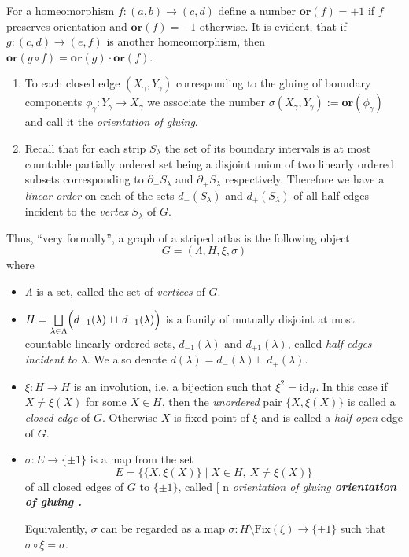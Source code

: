 \documentclass[12pt, reqno]{amsart}
\makeatletter
\def\myemphInternal#1{\if n\f@shape%
\begingroup\itshape #1\endgroup\/%
\else\begingroup\bfseries #1\endgroup%
\fi}
\def\myemph{\futurelet\testchar\MaybeOptArgmyemph}
\def\MaybeOptArgmyemph{\ifx[\testchar \let\next\OptArgmyemph
                 \else \let\next\NoOptArgmyemph \fi \next}
\def\OptArgmyemph[#1]#2{\index{#1}\myemphInternal{#2}}
\def\NoOptArgmyemph#1{\myemphInternal{#1}}
\newcommand{\strip}{S}
\newcommand{\bdX}{X}
\newcommand{\bdY}{Y}
\newcommand{\stInd}{{\lambda}}
\newcommand{\StInd}{\Lambda}
\newcommand{\bdGlueInd}{{\gamma}}
\newcommand{\id}{\mathrm{id}}
\newcommand\Gr{G}
\newcommand\ori{\mathbf{or}}
\newcommand\edge[2]{\{#1,#2\}}
\newcommand\mZZ{\{\pm1\}}
\makeatother
\begin{document}
For a homeomorphism $f:(a,b) \to (c,d)$ define a number $\ori(f) = +1$ if $f$ preserves orientation and $\ori(f) = -1$ otherwise.
It is evident, that if $g:(c,d) \to (e,f)$ is another homeomorphism, then $\ori(g\circ f) = \ori(g)\cdot \ori(f)$.


\begin{enumerate}[leftmargin=*, resume]
\item
To each closed edge $(\bdX_\bdGlueInd, \bdY_\bdGlueInd)$ corresponding to the gluing of boundary components $\phi_{\bdGlueInd}:\bdY_\bdGlueInd \to \bdX_\bdGlueInd$ we associate the number $\sigma(\bdX_\bdGlueInd, \bdY_\bdGlueInd):=\ori(\phi_{\bdGlueInd})$ and call it the \textit{orientation of gluing}.

\item
Recall that for each strip $\strip_{\stInd}$ the set of its boundary intervals is at most countable partially ordered set being a disjoint union of two linearly ordered subsets corresponding to $\partial_{-}\strip_{\stInd}$ and $\partial_{+}\strip_{\stInd}$ respectively.
Therefore we have a \textit{linear order} on each of the sets $d_{-}(\strip_{\stInd})$ and $d_{+}(\strip_{\stInd})$ of all half-edges incident to the \textit{vertex} $\strip_{\stInd}$ of $\Gr$.
\end{enumerate}

Thus, ``very formally'', a graph of a striped atlas is the following object
\[
\Gr = (\StInd, H, \xi, \sigma)
\]
where
\begin{itemize}[leftmargin=4ex]
\item 
$\StInd$ is a set, called the set of \textit{vertices} of $\Gr$.

\item 
$H = \mathop\bigsqcup\limits_{\stInd \in \StInd} \Bigl( d_{-1}(\stInd) \,\sqcup\, d_{+1}(\stInd) \Bigr)$ is a family of mutually disjoint at most countable linearly ordered sets, $d_{-1}(\stInd)$ and $d_{+1}(\stInd)$, called \textit{half-edges incident to $\stInd$}. 
We also denote $d(\stInd) = d_{-}(\stInd) \sqcup d_{+}(\stInd)$.

\item
$\xi: H \to H$ is an involution, i.e.\! a bijection such that $\xi^2 = \id_{H}$.
In this case if $\bdX\not=\xi(\bdX)$ for some $\bdX\in H$, then the \textit{unordered} pair $\edge{\bdX}{\xi(\bdX)}$ is called a \textit{closed edge} of $\Gr$.
Otherwise $\bdX$ is fixed point of $\xi$ and is called a \textit{half-open} edge of $\Gr$.

\item 
$\sigma: E \to \mZZ$ is a map from the set 
\[E = \bigl\{ \edge{\bdX}{\xi(\bdX)} \mid \bdX\in H, \ \bdX \not=\xi(\bdX) \bigr\}\]
of all closed edges of $\Gr$ to $\mZZ$, called \myemph{orientation of gluing}.

Equivalently, $\sigma$ can be regarded as a map $\sigma:H \setminus\mathrm{Fix}(\xi) \to \mZZ$ such that $\sigma\circ\xi=\sigma$.
\end{itemize}
\end{document}
